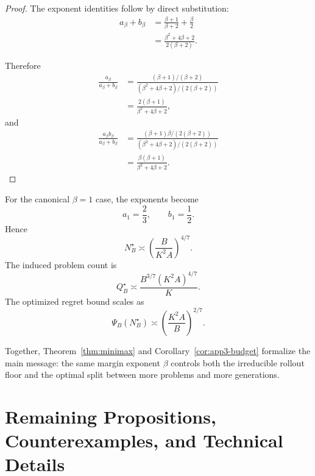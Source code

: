 \documentclass{article} %
\begin{document}
\begin{proof}
The exponent identities follow by direct substitution:
\begin{align}
a_\beta+b_\beta
&=
\frac{\beta+1}{\beta+2}
+
\frac{\beta}{2}
\label{eq:budget-proof-exp-a}
\\
&=
\frac{\beta^2+4\beta+2}{2(\beta+2)}.
\label{eq:budget-proof-exp-b}
\end{align}

Therefore
\begin{align}
\frac{a_\beta}{a_\beta+b_\beta}
&=
\frac{(\beta+1)/(\beta+2)}
{(\beta^2+4\beta+2)/(2(\beta+2))}
\label{eq:budget-proof-exp-c}
\\
&=
\frac{2(\beta+1)}{\beta^2+4\beta+2},
\label{eq:budget-proof-exp-d}
\end{align}
and
\begin{align}
\frac{a_\beta b_\beta}{a_\beta+b_\beta}
&=
\frac{
(\beta+1)\beta/(2(\beta+2))
}{
(\beta^2+4\beta+2)/(2(\beta+2))
}
\label{eq:budget-proof-exp-e}
\\
&=
\frac{\beta(\beta+1)}{\beta^2+4\beta+2}.
\label{eq:budget-proof-exp-f}
\end{align}
\end{proof}

For the canonical \(\beta=1\) case, the exponents become
\begin{equation}
\label{eq:budget-beta1-ab}
a_1=\frac{2}{3},
\qquad
b_1=\frac{1}{2}.
\end{equation}
Hence
\begin{equation}
\label{eq:budget-beta1-N}
N_B^\star
\asymp
\left(\frac{B}{K^2A}\right)^{4/7}.
\end{equation}
The induced problem count is
\begin{equation}
\label{eq:budget-beta1-Q}
Q_B^\star
\asymp
\frac{B^{3/7}(K^2A)^{4/7}}{K}.
\end{equation}
The optimized regret bound scales as
\begin{equation}
\label{eq:budget-beta1-rate}
\Psi_B(N_B^\star)
\asymp
\left(\frac{K^2A}{B}\right)^{2/7}.
\end{equation}

Together, Theorem~\ref{thm:minimax} and Corollary~\ref{cor:app3-budget}
formalize the main message: the same margin exponent \(\beta\) controls both
the irreducible rollout floor and the optimal split between more problems and
more generations.

\section{Remaining Propositions, Counterexamples, and Technical Details}
\label{app:proofs-remaining}
\end{document}

